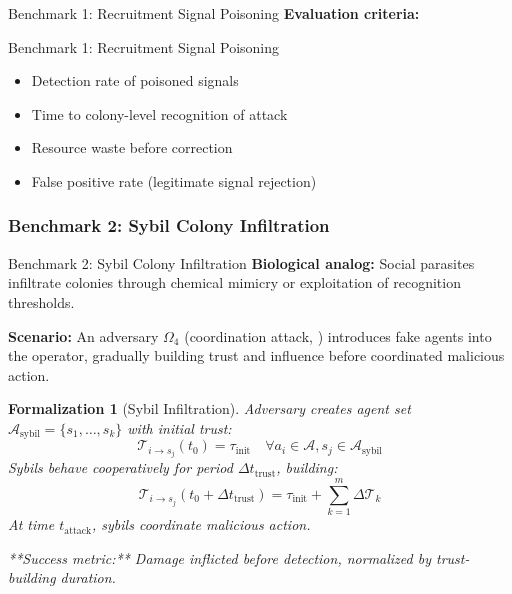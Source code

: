 \documentclass[
  ignorenonframetext,
]{beamer}
\providecommand{\tightlist}{%
  \setlength{\itemsep}{0pt}\setlength{\parskip}{0pt}}
\providecommand{\cref}[1]{\texttt{\detokenize{#1}}}
\newtheorem{formalization}{Formalization}
\begin{document}
\begin{frame}[allowframebreaks]{Benchmark 1: Recruitment Signal
Poisoning}
\textbf{Evaluation criteria:}

\end{frame}

\begin{frame}[allowframebreaks]{Benchmark 1: Recruitment Signal
Poisoning}
\begin{itemize}
\tightlist
\item
  Detection rate of poisoned signals
\item
  Time to colony-level recognition of attack
\item
  Resource waste before correction
\item
  False positive rate (legitimate signal rejection)
\end{itemize}
\end{frame}

\subsubsection{Benchmark 2: Sybil Colony
Infiltration}\label{sec:benchmark-sybil}

\begin{frame}[allowframebreaks]{Benchmark 2: Sybil Colony Infiltration}
\textbf{Biological analog:} Social parasites infiltrate colonies through
chemical mimicry or exploitation of recognition thresholds.

\textbf{Scenario:} An adversary \(\Omega_4\) (coordination attack,
\cref{sec:adversary-classes}) introduces fake agents into the operator,
gradually building trust and influence before coordinated malicious
action.

\begin{formalization}[Sybil Infiltration]
\label{form:sybil-infiltration}
Adversary creates agent set $\mathcal{A}_{\text{sybil}} = \{s_1, \ldots, s_k\}$ with initial trust:
\begin{equation}
\mathcal{T}_{i \to s_j}(t_0) = \tau_{\text{init}} \quad \forall a_i \in \mathcal{A}, s_j \in \mathcal{A}_{\text{sybil}}
\label{eq:sybil-initial-trust}
\end{equation}
Sybils behave cooperatively for period $\Delta t_{\text{trust}}$, building:
\begin{equation}
\mathcal{T}_{i \to s_j}(t_0 + \Delta t_{\text{trust}}) = \tau_{\text{init}} + \sum_{k=1}^{m} \Delta\mathcal{T}_k
\label{eq:sybil-trust-accumulation}
\end{equation}
At time $t_{\text{attack}}$, sybils coordinate malicious action.

**Success metric:** Damage inflicted before detection, normalized by trust-building duration.
\end{formalization}

\end{frame}
\end{document}
